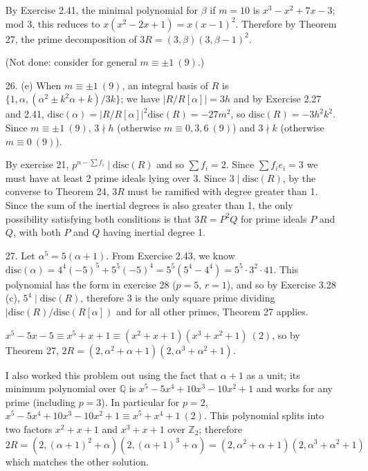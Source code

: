 \documentclass{article}
\newcommand{\Q}[0]{\mathbb{Q}}
\newcommand{\Z}[0]{\mathbb{Z}}
\newcommand{\disc}[1]{\text{disc}(#1)}
\newcommand{\modequiv}[3]{#1 \equiv #2\ (#3)}
\begin{document}
\begin{enumerate}
By Exercise 2.41, the minimal polynomial for $\beta$ if $m = 10$ is $x^3 - x^2 + 7x - 3$; mod 3, this reduces to $x(x^2 - 2x + 1) = x(x - 1)^2$.  Therefore by Theorem 27, the prime decomposition of $3R = (3, \beta)(3, \beta - 1)^2$.

(Not done: consider for general $\modequiv{m}{\pm 1}{9}$.)

\item[26. (e)] When $\modequiv{m}{\pm 1}{9}$, an integral basis of $R$ is $\{1, \alpha, (\alpha^2 \pm k^2\alpha + k)/3k\}$; we have $|R / R[\alpha]| = 3h$ and by Exercise 2.27 and 2.41, $\disc{\alpha} = |R / R[\alpha]|^2 \disc{R} = -27m^2$, so $\disc{R} = -3h^2k^2$.  Since $\modequiv{m}{\pm 1}{9}$, $3 \nmid h$ (otherwise $\modequiv{m}{0, 3, 6}{9}$) and $3 \nmid k$ (otherwise $\modequiv{m}{0}{9}$).

By exercise 21, $p^{n - \sum f_i} \mid \disc{R}$ and so $\sum f_i = 2$.  Since $\sum f_i e_i = 3$ we must have at least 2 prime ideals lying over 3.  Since $3 \mid \disc{R}$, by the converse to Theorem 24, $3R$ must be ramified with degree greater than 1.  Since the sum of the inertial degrees is also greater than 1, the only possibility satisfying both conditions is that $3R = P^2 Q$ for prime ideals $P$ and $Q$, with both $P$ and $Q$ having inertial degree 1.

\item[27.] Let $\alpha^5 = 5(\alpha + 1)$.  From Exercise 2.43, we know $\disc{\alpha} = 4^4 (-5)^5 + 5^5 (-5)^4 = 5^5 (5^4 - 4^4) = 5^5 \cdot 3^2 \cdot 41$.  This polynomial has the form in exercise 28 ($p = 5$, $r = 1$), and so by Exercise 3.28 (c), $5^4 \mid \disc{R}$, therefore 3 is the only square prime dividing $|\disc{R} / \disc{R[\alpha]}$ and for all other primes, Theorem 27 applies.

$x^5 - 5x - 5 \equiv x^5 + x + 1 \equiv (x^2 + x + 1)(x^3 + x^2 + 1)\ (2)$, so by Theorem 27, $2R = (2, \alpha^2 + \alpha + 1)(2, \alpha^3 + \alpha^2 + 1)$.

I also worked this problem out using the fact that $\alpha + 1$ as a unit; its minimum polynomial over $\Q$ is $x^5 - 5x^4 + 10x^3 - 10x^2 + 1$ and works for any prime (including $p = 3$).  In particular for $p = 2$, $x^5 - 5x^4 + 10x^3 - 10x^2 + 1 \equiv x^5 + x^4 + 1\ (2)$.  This polynomial splits into two factors $x^2 + x + 1$ and $x^3 + x + 1$ over $\Z_{2}$; therefore $2R = (2, (\alpha + 1)^2 + \alpha)(2, (\alpha + 1)^3 + \alpha) = (2, \alpha^2 + \alpha + 1)(2, \alpha^3 + \alpha^2 + 1)$ which matches the other solution.


\end{enumerate}
\end{document}
